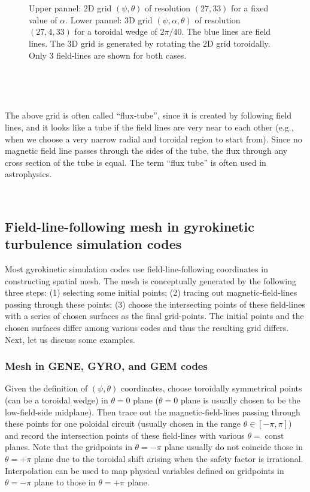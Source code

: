 \documentclass{llncs}
\newcommand{\tmop}[1]{\ensuremath{\operatorname{#1}}}
\begin{document}
\

\

\begin{figure}[h]
  \caption{Upper pannel: 2D grid $(\psi, \theta)$ of resolution $(27, 33)$ for
  a fixed value of $\alpha$. Lower pannel: 3D grid $(\psi, \alpha, \theta)$ of
  resolution $(27, 4, 33)$ for a toroidal wedge of $2 \pi / 40$. The blue
  lines are field lines. The 3D grid is generated by rotating the 2D grid
  toroidally. Only 3 field-lines are shown for both cases.}
\end{figure}

\

\

The above grid is often called ``flux-tube'', since it is created by
following field lines, and it looks like a tube if the field lines are very
near to each other (e.g., when we choose a very narrow radial and toroidal
region to start from). Since no magnetic field line passes through the sides
of the tube, the flux through any cross section of the tube is equal. The term
``flux tube'' is often used in astrophysics.

\

\subsection{Field-line-following mesh in gyrokinetic turbulence simulation
codes}

Most gyrokinetic simulation codes use field-line-following coordinates in
constructing spatial mesh. The mesh is conceptually generated by the following
three steps: (1) selecting some initial points; (2) tracing out
magnetic-field-lines passing through these points; (3) choose the intersecting
points of these field-lines with a series of chosen surfaces as the final
grid-points. The initial points and the chosen surfaces differ among various
codes and thus the resulting grid differs. Next, let us discuss some examples.

\subsubsection{Mesh in GENE, GYRO, and GEM codes}

Given the definition of $(\psi, \theta)$ coordinates, choose toroidally
symmetrical points (can be a toroidal wedge) in $\theta = 0$ plane ($\theta =
0$ plane is usually chosen to be the low-field-side midplane). Then trace out
the magnetic-field-lines passing through these points for one poloidal circuit
(usually chosen in the range $\theta \in [- \pi, \pi]$) and record the
intersection points of these field-lines with various $\theta = \tmop{const}$
planes. Note that the gridpoints in $\theta = - \pi$ plane usually do not
coincide those in $\theta = + \pi$ plane due to the toroidal shift arising
when the safety factor is irrational. Interpolation can be used to map
physical variables defined on gridpoints in $\theta = - \pi$ plane to those in
$\theta = + \pi$ plane.
\end{document}
